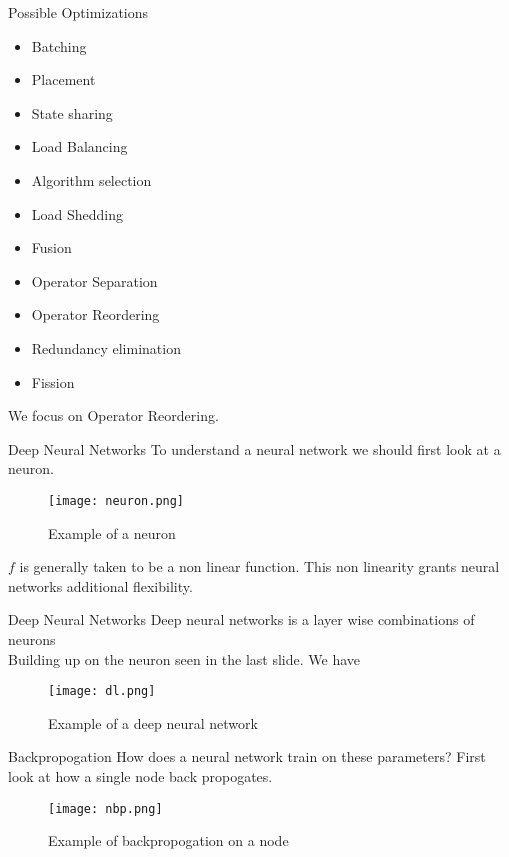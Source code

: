 \begin{frame}{Possible Optimizations}
    \begin{itemize}
        \item Batching
        \item Placement
        \item State sharing
        \item Load Balancing
        \item Algorithm selection
        \item Load Shedding
        \item Fusion
        \item Operator Separation
        \item Operator Reordering
        \item Redundancy elimination
        \item Fission
    \end{itemize}
    We focus on Operator Reordering.
\end{frame}

\begin{frame}{Deep Neural Networks}
    To understand a neural network we should first look at a neuron. 
    \begin{figure}
        \centering
        \texttt{[image: neuron.png]}\\
        \caption{Example of a neuron}
        \label{fig:neuron}
    \end{figure}
    $f$ is generally taken to be a non linear function. This non linearity grants neural networks additional flexibility.
\end{frame}


\begin{frame}{Deep Neural Networks}
    Deep neural networks is a layer wise combinations of neurons\\
    Building up on the neuron seen in the last slide. We have
    \begin{figure}
        \centering
        \texttt{[image: dl.png]}\\
        \caption{Example of a deep neural network}
        \label{fig:dl}
    \end{figure}
\end{frame}

\begin{frame}{Backpropogation}
    How does a neural network train on these parameters? First look at how a single node back propogates.
    \begin{figure}
        \centering
        \texttt{[image: nbp.png]}\\
        \caption{Example of backpropogation on a node}
        \label{fig:nbp}
    \end{figure}
\end{frame}

